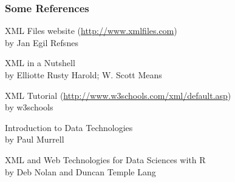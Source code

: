 \documentclass[12pt]{beamer}\usepackage[]{graphicx}\usepackage[]{color}
\begin{document}

\begin{frame}
\frametitle{Some References}

\bi
 \item XML Files website {\scriptsize (\url{http://www.xmlfiles.com})} \\
 {\lolit by Jan Egil Refsnes}
 \item XML in a  Nutshell \\
 {\lolit by Elliotte Rusty Harold; W. Scott Means}
 \item XML Tutorial {\scriptsize (\url{http://www.w3schools.com/xml/default.asp})} \\
 {\lolit by w3schools}
 \item Introduction to Data Technologies \\
 {\lolit by Paul Murrell}
 \item XML and Web Technologies for Data Sciences with R \\
 {\lolit by Deb Nolan and Duncan Temple Lang}
\ei

\end{frame}

\end{document}
